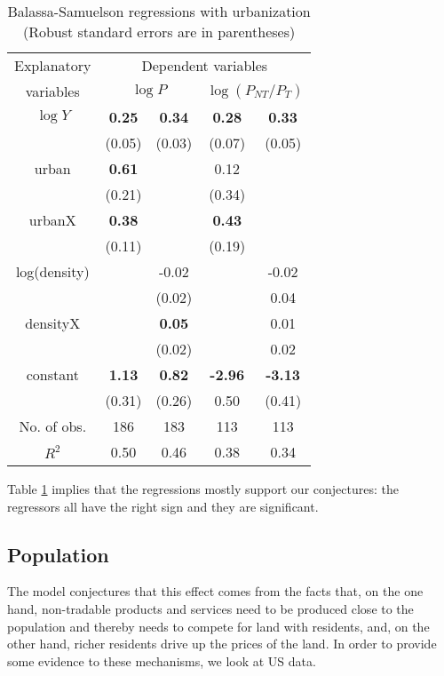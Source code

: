 \documentclass[12pt]{article}
\begin{document}
\begin{table}[h]
\caption{Balassa-Samuelson regressions with urbanization (Robust
standard errors are in parentheses)} \center \label{tab:BS}
\begin{tabular}{c|cc|cc}
  \hline\hline
  Explanatory & \multicolumn{4}{|c}{Dependent variables} \\
  variables &\multicolumn{2}{c}{$\log P$} & \multicolumn{2}{c}{$\log(P_{NT}/P_T)$} \\ \hline
  $\log Y$ & \textbf{0.25} & \textbf{0.34} & \textbf{0.28}   & \textbf{0.33} \\
           & (0.05)        & (0.03)        & (0.07)          & (0.05)        \\
  urban    & \textbf{0.61} &               & 0.12            &               \\
           & (0.21)        &               & (0.34)          &               \\
  urbanX   & \textbf{0.38} &               & \textbf{0.43}   &              \\
           & (0.11)        &               & (0.19)          &              \\
  log(density) &           & -0.02         &                 & -0.02        \\
             &             & (0.02)        &                 &  0.04        \\
  densityX &               & \textbf{0.05} &                  & 0.01         \\
           &               & (0.02)        &                 & 0.02         \\
  constant & \textbf{1.13} & \textbf{0.82} & \textbf{-2.96}  & \textbf{-3.13}\\
           & (0.31)        & (0.26)        & 0.50            & (0.41)        \\ \hline
  No. of obs. & 186        & 183           & 113             & 113          \\
  $R^2$    & 0.50          & 0.46          & 0.38            & 0.34  \\
  \hline\hline
\end{tabular}
\end{table}

Table \ref{tab:BS} implies that the regressions mostly support our
conjectures: the regressors all have the right sign and they are
significant. 

\subsection{Population }
The model conjectures that this effect comes from the facts that, on
the one hand, non-tradable products and services need to be produced
close to the population and thereby needs to compete for land with
residents, and, on the other hand, richer residents drive up the
prices of the land. In order to provide some evidence to these
mechanisms, we look at US data.
\end{document}

